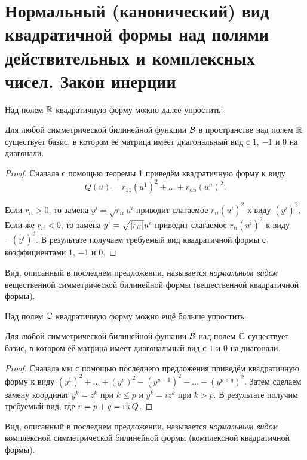 \section{Нормальный (канонический) вид квадратичной формы над полями действительных и комплексных чисел. Закон инерции}

Над полем $\mathbb{R}$ квадратичную форму можно далее упростить:

\begin{proposal}
    Для любой симметрической билинейной функции $\mathcal{B}$ в пространстве над полем $\mathbb{R}$ существует базис, в котором её матрица имеет диагональный вид с $1$, $-1$ и $0$ на диагонали.
\end{proposal}

\begin{proof}
    Сначала с помощью теоремы 1 приведём квадратичную форму к виду
    \[
        Q(u) = r_{11}(u^1)^2 + \ldots + r_{nn}(u^n)^2.
    \]

    Если $r_{ii} > 0$, то замена $y^i = \sqrt{r_{ii}}u^i$ приводит слагаемое $r_{ii}(u^i)^2$ к виду $(y^i)^2$. Если же $r_{ii} < 0$, то замена $y^i = \sqrt{\left\lvert r_{ii}\right\rvert}u^i$ приводит слагаемое $r_{ii}(u^i)^2$ к виду $-(y^i)^2$. В результате получаем требуемый вид квадратичной формы с коэффициентами $1$, $-1$ и $0$.
\end{proof}

\begin{definition}
    Вид, описанный в последнем предложении, называется \textit{нормальным видом} вещественной симметрической билинейной формы (вещественной квадратичной формы).
\end{definition}

Над полем $\mathbb{C}$ квадратичную форму можно ещё больше упростить:

\begin{proposal}
    Для любой симметрической билинейной функции $\mathcal{B}$ над полем $\mathbb{C}$ существует базис, в котором её матрица имеет диагональный вид с $1$ и $0$ на диагонали.
\end{proposal}

\begin{proof}
    Сначала мы с помощью последнего предложения приведём квадратичную форму к виду $(y^1)^2 + \ldots + (y^p)^2 - (y^{p + 1})^2 - \ldots - (y^{p + q})^2$. Затем сделаем замену координат $y^k = z^k$ при $k \leqslant p$ и $y^k = iz^k$ при $k > p$. В результате получим требуемый вид, где $r = p + q = \operatorname{rk} Q$.
\end{proof}

\begin{definition}
    Вид, описанный в последнем предложении, называется \textit{нормальным видом} комплексной симметрической билинейной формы (комплексной квадратичной формы).
\end{definition}

